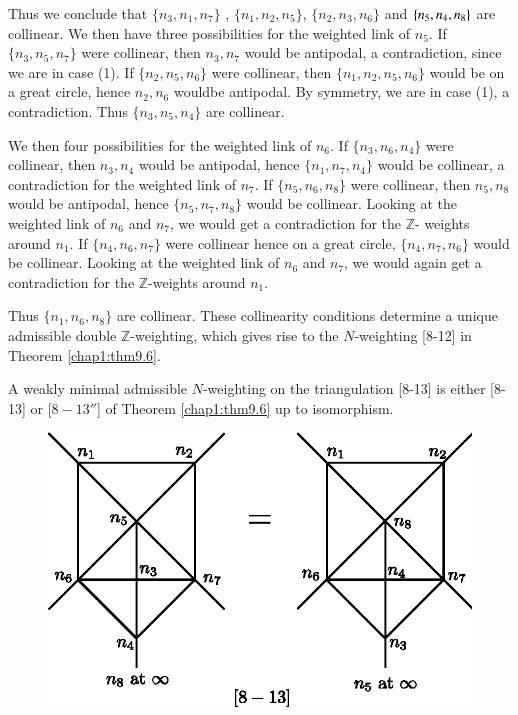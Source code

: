 Thus we conclude that $\{ n_3, n_1, n_7 \}$ , $\{ n_1, n_2, n_5 \}$,
$\{ n_2, n_3, n_6 \}$ and $\{n_5,\break n_4, n_8 \}$ are collinear.  We
then have three possibilities for the weighted link of $n_5$. If $\{
n_3, n_5, n_7 \}$ were collinear, then $n_3, n_7$ would be antipodal,
a contradiction, since we are in case (1). If $\{ n_2, n_5, n_6 \}$
were collinear, then $\{ n_1, n_2,  n_5, n_6 \}$ would be on a great
circle, hence $n_2, n_6$ would\pageoriginale be antipodal. By
symmetry, we are in case (1), a contradiction. Thus $\{ n_3, n_5, n_4
\}$ are collinear.  

We then four possibilities for the weighted link of $n_6$.  If $\{
n_3, n_6, n_4 \}$  were collinear, then $n_3, n_4$ would be antipodal,
hence $\{ n_1, n_7, n_4 \}$ would be collinear,  a contradiction for
the weighted link of $n_7$. If $\{ n_5, n_6, n_8 \}$ were collinear,
then $n_5, n_8$ would be antipodal, hence $\{ n_5, n_7, n_8 \}$ would
be collinear.  Looking at the weighted link of $n_6$ and $n_7$, we
would get a contradiction for the $\mathbb{Z}$- weights around $n_1$.
If $\{ n_4, n_6, n_7 \}$ were collinear hence on a great circle, $\{
n_4, n_7, n_6 \}$ would be collinear. Looking at the weighted link of
$n_6$ and $n_7$, we would again get a contradiction for the
$\mathbb{Z}$-weights around $n_1$. 

Thus $\{ n_1, n_6, n_8 \}$ are collinear. These collinearity
conditions determine a unique admissible double $\mathbb{Z}$-weighting,
which gives rise to the $N$-weighting [8-12] in Theorem 
\ref{chap1:thm9.6}.  

\begin{lemma}\label{chap1:lem9.20}
A weakly minimal admissible $N$-weighting on the triangulation [8-13]
is either [8-13] or [$8-13''$] of Theorem \ref{chap1:thm9.6} up to isomorphism. 
\begin{figure}[H]
\centering 
\includegraphics{vol58-fig/fig58-55.eps} 
\end{figure}
\end{lemma}

